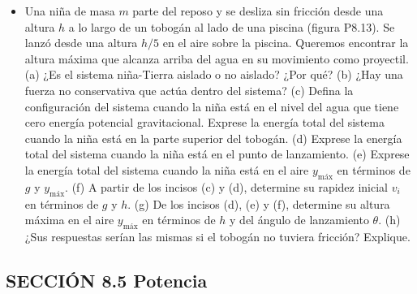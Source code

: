 \documentclass[11pt,a4paper]{article}
\begin{document}
\begin{itemize}
    \item[\textbf{13.}] Una niña de masa $m$ parte del reposo y se desliza sin fricción desde una altura $h$ a lo largo de un tobogán al lado de una piscina (figura P8.13). Se lanzó desde una altura $h/5$ en el aire sobre la piscina. Queremos encontrar la altura máxima que alcanza arriba del agua en su movimiento como proyectil. (a) ¿Es el sistema niña-Tierra aislado o no aislado? ¿Por qué? (b) ¿Hay una fuerza no conservativa que actúa dentro del sistema? (c) Defina la configuración del sistema cuando la niña está en el nivel del agua que tiene cero energía potencial gravitacional. Exprese la energía total del sistema cuando la niña está en la parte superior del tobogán. (d) Exprese la energía total del sistema cuando la niña está en el punto de lanzamiento. (e) Exprese la energía total del sistema cuando la niña está en el aire $y_{\text{máx}}$ en términos de $g$ y $y_{\text{máx}}$. (f) A partir de los incisos (c) y (d), determine su rapidez inicial $v_i$ en términos de $g$ y $h$. (g) De los incisos (d), (e) y (f), determine su altura máxima en el aire $y_{\text{máx}}$ en términos de $h$ y del ángulo de lanzamiento $\theta$. (h) ¿Sus respuestas serían las mismas si el tobogán no tuviera fricción? Explique.
    \vspace*{9cm}
\end{itemize}

\subsection*{SECCIÓN 8.5 Potencia}
\end{document}
